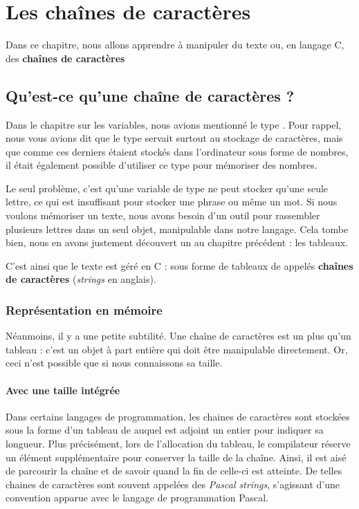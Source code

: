 \chapter{Les chaînes de caractères}
\label{Les chaînes de caractères}

Dans ce chapitre, nous allons apprendre à manipuler du texte ou,
en langage C, des \textbf{chaînes de caractères}

\section{Qu'est-ce qu'une chaîne de caractères ?}
\label{qu-est-ce-qu-une-chaine-de-caractères ?}

Dans le chapitre sur les variables, nous avions mentionné le type .
Pour rappel, nous vous avions dit que le type  servait surtout
au stockage de caractères, mais que comme ces derniers étaient stockés
dans l'ordinateur sous forme de nombres, il était également possible
d'utiliser ce type pour mémoriser des nombres.

Le seul problème, c'est qu'une variable de type  ne peut
stocker qu'une seule lettre, ce qui est insuffisant pour stocker une
phrase ou même un mot. Si nous voulons mémoriser un texte, nous avons
besoin d'un outil pour rassembler plusieurs lettres dans un seul objet,
manipulable dans notre langage. Cela tombe bien, nous en avons justement
découvert un au chapitre précédent : les tableaux.

C'est ainsi que le texte est géré en C : sous forme de tableaux de
 appelés \textbf{chaînes de caractères} (\emph{strings} en
anglais).

\subsection{Représentation en mémoire}
\label{representation-en-memoire-2}

Néanmoins, il y a une petite subtilité. Une chaîne de caractères est un
plus qu'un tableau : c'est un objet à part entière qui doit être
manipulable directement. Or, ceci n'est possible que si nous connaissons
sa taille.

\subsubsection{Avec une taille intégrée}
\label{avec-une-taille-integree}

Dans certains langages de programmation, les chaines de caractères sont
stockées sous la forme d'un tableau de  auquel est adjoint
un entier pour indiquer sa longueur. Plus précisément, lors de
l'allocation du tableau, le compilateur réserve un élément
supplémentaire pour conserver la taille de la chaîne. Ainsi, il est aisé
de parcourir la chaîne et de savoir quand la fin de celle-ci est
atteinte. De telles chaines de caractères sont souvent appelées des
\emph{Pascal strings}, s'agissant d'une convention apparue avec le
langage de programmation Pascal.

